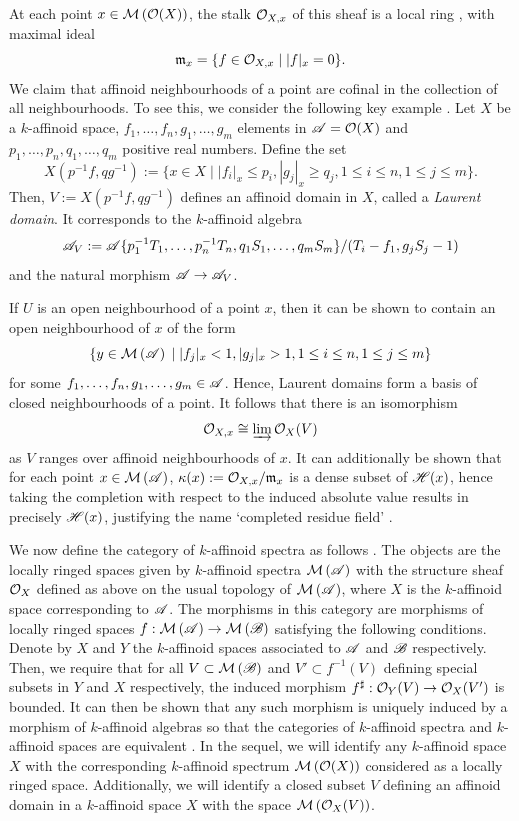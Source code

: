 At each point $x \in \mathcal{M}\left(\mathcal{O}(X)\right)$, the stalk $\mathcal{O}_{X, x}$ of this sheaf is a local ring \parencite[\S 2.3]{berk1}, with maximal ideal
\[
\mathfrak{m}_x = \{f \in \mathcal{O}_{X, x} \; | \; |f|_x = 0  \}.
\]
We claim that affinoid neighbourhoods of a point are cofinal in the collection of all neighbourhoods.
To see this, we consider the following key example  \parencite[\S 2.2.2]{berk1}. 
Let $X$ be a $k$-affinoid space, $f_1, \dots, f_n, g_1, \dots, g_m$ elements in $\mathscr{A} = \mathcal{O}(X)$ and $p_1, \dots, p_n, q_1, \dots, q_m$ positive real numbers.
Define the set 
     \[
        X(p^{-1}f, qg^{-1}) := \{ x \in X \; \vert \; |f_i|_x \leq p_i, |g_j|_x \geq q_j, 1 \leq i \leq n, 1 \leq j \leq m\}.
     \]
Then, $V := X(p^{-1}f, qg^{-1})$ defines an affinoid domain in $X$, called a \textit{Laurent domain}. 
It corresponds to the $k$-affinoid algebra 
    \[
        \mathscr{A}_V := \mathscr{A} \{ p_1^{-1} T_1, \dots, p_n^{-1} T_n, q_1S_1, \dots, q_mS_m\}/(T_i - f_1, g_jS_j - 1) 
    \]
and the natural morphism $\mathscr{A} \to \mathscr{A}_V$.

If $U$ is an open neighbourhood of a point $x$, then it can be shown to contain an open neighbourhood of $x$ of the form \[\{ y \in \mathcal{M}\left(\mathscr{A}\right)  \; \vert \; |f_j|_x < 1, |g_j|_x > 1, 1 \leq i \leq n, 1 \leq j \leq m\}\] for some $f_1, \dots, f_n, g_1, \dots, g_m \in \mathscr{A}$.
Hence, Laurent domains form a basis of closed neighbourhoods of a point.
It follows that there is an isomorphism
    \[
        \mathcal{O}_{X, x} \cong \varinjlim \mathcal{O}_{X}(V)
    \]
as $V$ ranges over affinoid neighbourhoods of $x$.
It can additionally be shown that for each point $x \in \mathcal{M}\left(\mathscr{A}\right)$, $\kappa(x) := \mathcal{O}_{X, x}/\mathfrak{m}_{x}$ is a dense subset of $\mathscr{H}(x)$, hence taking the completion with respect to the induced absolute value results in precisely $\mathscr{H}(x)$, justifying the name `completed residue field' \parencite[\S 2.1]{berk93}.


We now define the category of $k$-affinoid spectra as follows \parencite[Definition 3.3.3.1]{temk}.
The objects are the locally ringed spaces given by $k$-affinoid spectra $\mathcal{M}\left(\mathscr{A}\right)$ with the structure sheaf $\mathcal{O}_X$ defined as above on the usual topology of $\mathcal{M}\left(\mathscr{A}\right)$, where $X$ is the $k$-affinoid space corresponding to $\mathscr{A}$.
The morphisms in this category are morphisms of locally ringed spaces $f: \mathcal{M}\left(\mathscr{A}\right) \to \mathcal{M}\left(\mathscr{B}\right)$ satisfying the following conditions.
Denote by $X$ and $Y$ the $k$-affinoid spaces associated to $\mathscr{A}$ and $\mathscr{B}$ respectively.
Then, we require that for all $V \subset \mathcal{M}\left(\mathscr{B}\right)$ and $V' \subset f^{-1}(V)$ defining special subsets in $Y$ and $X$ respectively, the induced morphism $f^{\sharp}: \mathcal{O}_{Y}(V) \to \mathcal{O}_{X}(V')$ is bounded.
It can then be shown that any such morphism is uniquely induced by a morphism of $k$-affinoid algebras so that the categories of $k$-affinoid spectra and $k$-affinoid spaces are equivalent \parencite[\S 3.3.3]{temk}.
In the sequel, we will identify any $k$-affinoid space $X$ with the corresponding $k$-affinoid spectrum $\mathcal{M}\left(\mathcal{O}(X)\right)$ considered as a locally ringed space.
Additionally, we will identify a closed subset $V$ defining an affinoid domain in a $k$-affinoid space $X$ with the space $\mathcal{M}\left(\mathcal{O}_X(V)\right)$.


